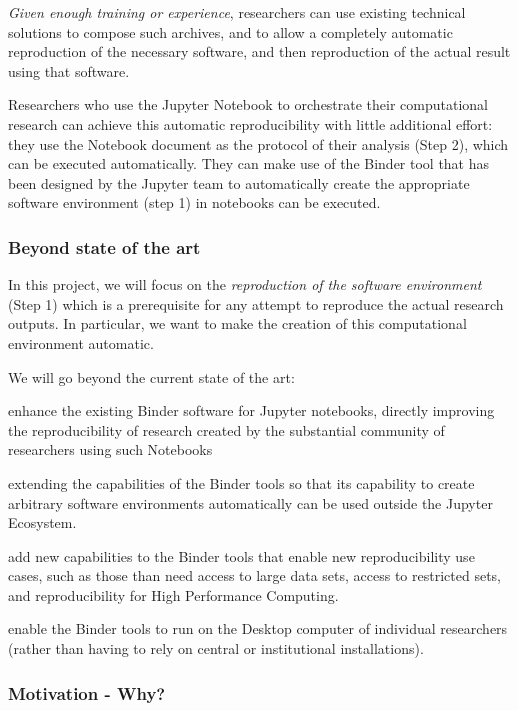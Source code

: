\emph{Given enough training or experience}, researchers can use existing technical
solutions to compose such archives, and to allow a completely automatic
reproduction of the necessary software, and then reproduction of the actual
result using that software. 

\medskip Researchers who use the Jupyter Notebook to orchestrate their
computational research can achieve this automatic reproducibility with little
additional effort: they use the Notebook document as the protocol of their
analysis (Step 2), which can be executed automatically. They can make use of the
Binder tool that has been designed by the Jupyter team to automatically create
the appropriate software environment (step 1) in notebooks can be executed.

\subsubsection{Beyond state of the art}

In this project, we will focus on the \emph{reproduction of the
  software environment} (Step 1) which is a prerequisite for any attempt to
reproduce the actual research outputs. In particular, we want to make the
creation of this computational environment automatic.

We will go beyond the current state of the art:
\begin{compactitem}
\item enhance the existing Binder software for Jupyter notebooks,
  directly improving the reproducibility of research created by the substantial
  community of researchers using such Notebooks
\item extending the capabilities of the Binder tools so that its capability to
  create arbitrary software environments automatically can be used outside the
  Jupyter Ecosystem.
\item add new capabilities to the Binder tools that enable new reproducibility
  use cases, such as those than need access to large data sets, access to restricted sets,
  and reproducibility for High Performance Computing.
\item enable the Binder tools to run on the Desktop computer of individual
  researchers (rather than having to rely on central or institutional
  installations).
\end{compactitem}

\subsubsection{Motivation - Why?}

